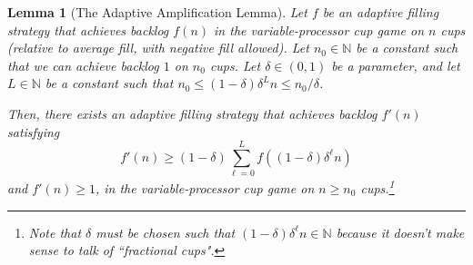 \documentclass[twocolumn]{article}[10pt]
\newtheorem{lemma}{Lemma}
\begin{document}
\begin{lemma}[The Adaptive Amplification Lemma]\label{lem:adaptiveAmplification}
  Let $f$ be an adaptive filling strategy that achieves backlog $f(n)$ in the
  variable-processor cup game on $n$ cups (relative to average fill, with
  negative fill allowed).
  Let $n_0 \in \mathbb{N}$ be a constant such that we can achieve backlog $1$ on $n_0$ cups.
  Let $\delta\in(0,1)$ be a parameter, and let $L\in\mathbb{N}$ be a constant
  such that $n_0 \le (1-\delta)\delta^L n \le n_0/\delta$.

  Then, there exists an adaptive filling strategy that achieves backlog $f'(n)$ satisfying
  $$f'(n) \ge (1-\delta)\sum_{\ell= 0}^{L} f((1-\delta)\delta^\ell n)$$
  and $f'(n) \ge 1$, in the variable-processor cup game on $n\ge n_0$ cups.\footnote{Note that $\delta$ must be chosen such that $(1-\delta)\delta^\ell n \in \mathbb{N}$ because it doesn't make sense to talk of ``fractional cups".}
\end{lemma}
\end{document}
